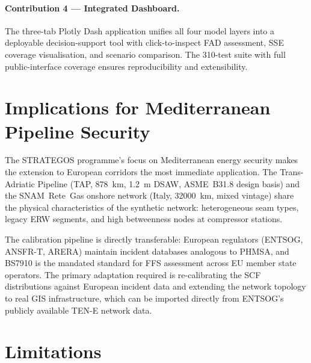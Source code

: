 \paragraph{Contribution 4 — Integrated Dashboard.}
The three-tab Plotly Dash application unifies all four model layers
into a deployable decision-support tool with click-to-inspect FAD
assessment, SSE coverage visualisation, and scenario comparison.
The 310-test suite with full public-interface coverage ensures
reproducibility and extensibility.

\section{Implications for Mediterranean Pipeline Security}
\label{sec:conclusion_med}

The STRATEGOS programme's focus on Mediterranean energy security makes
the extension to European corridors the most immediate application.
The Trans-Adriatic Pipeline (\ac{TAP}, \SI{878}{\kilo\meter},
\SI{1.2}{\meter} DSAW, \acs{ASME}~B31.8 design basis) and the
SNAM~Rete~Gas onshore network (Italy, \SI{32000}{\kilo\meter},
mixed vintage) share the physical characteristics of the synthetic
network: heterogeneous seam types, legacy ERW segments, and high
betweenness nodes at compressor stations.

The calibration pipeline is directly transferable: European regulators
(ENTSOG, ANSFR-T, ARERA) maintain incident databases analogous to
\ac{PHMSA}, and \ac{BS7910} is the mandated standard for FFS
assessment across EU member state operators.  The primary adaptation
required is re-calibrating the SCF distributions against European
incident data and extending the network topology to real GIS
infrastructure, which can be imported directly from ENTSOG's
publicly available TEN-E network data.

\section{Limitations}
\label{sec:conclusion_limitations}

